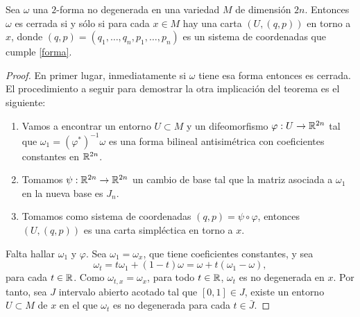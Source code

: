 \begin{thm}[Darboux]
  Sea $\omega$ una $2$-forma no degenerada en una variedad $M$ de dimensión $2n$. Entonces $\omega$ es cerrada si y sólo si para cada $x\in M$ hay una carta $(U,(q,p))$ en torno a $x$, donde $(q,p)=(q_1,\dots,q_n,p_1,\dots,p_n)$ es un sistema de coordenadas que cumple \eqref{forma}. 
\end{thm}
\begin{proof}
  En primer lugar, inmediatamente si $\omega$ tiene esa forma entonces es cerrada. El procedimiento a seguir para demostrar la otra implicación del teorema es el siguiente:
  \begin{enumerate}
    \item Vamos a encontrar un entorno $U \subset M$ y un difeomorfismo $\varphi : U \rightarrow \mathbb{R}^{2n}$ tal que $\omega_1= (\varphi^*)^{-1}\omega$ es una forma bilineal antisimétrica con coeficientes constantes en $\mathbb{R}^{2n}$.
    \item Tomamos $\psi: \mathbb{R}^{2n} \rightarrow \mathbb{R}^{2n}$ un cambio de base tal que la matriz asociada a $\omega_1$ en la nueva base es $J_n$. 
    \item Tomamos como sistema de coordenadas $(q,p)=\psi \circ \varphi$, entonces $(U,(q,p))$ es una carta simpléctica en torno a $x$.
  \end{enumerate}

\begin{center}
\end{center}

  Falta hallar $\omega_1$ y $\varphi$. Sea $\omega_1=\omega_x$, que tiene coeficientes constantes, y sea
  \begin{equation*}
    \omega_t=t\omega_1 + (1-t) \omega = \omega + t(\omega_1-\omega),
  \end{equation*}
  para cada $t\in \mathbb{R}$. Como $\omega_{t,x}=\omega_x$, para todo $t \in \mathbb{R}$, $\omega_t$ es no degenerada en $x$. Por tanto, sea $J$ intervalo abierto acotado tal que $[0,1]\in J$, existe un entorno $U \subset M$ de $x$ en el que $\omega_t$ es no degenerada para cada $t\in \bar{J}$.


\end{proof}
